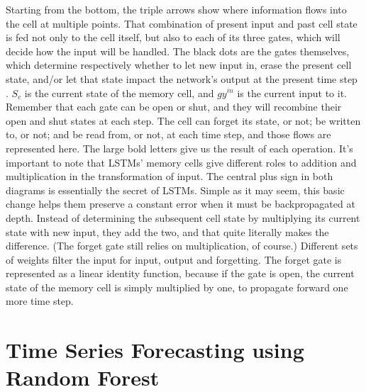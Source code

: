 \par Starting from the bottom, the triple arrows show where information flows into the cell at multiple points. That combination of present input and past cell state is fed not only to the cell itself, but also to each of its three gates, which will decide how the input will be handled. The black dots are the gates themselves, which determine respectively whether to let new input in, erase the present cell state, and/or let that state impact the network’s output at the present time step \cite{kyriakides2007short}. $S_{c}$ is the current state of the memory cell, and $gy^{in}$ is the current input to it. Remember that each gate can be open or shut, and they will recombine their open and shut states at each step. The cell can forget its state, or not; be written to, or not; and be read from, or not, at each time step, and those flows are represented here. The large bold letters give us the result of each operation. It’s important to note that LSTMs’ memory cells give different roles to addition and multiplication in the transformation of input. The central plus sign in both diagrams is essentially the secret of LSTMs. Simple as it may seem, this basic change helps them preserve a constant error when it must be backpropagated at depth. Instead of determining the subsequent cell state by multiplying its current state with new input, they add the two, and that quite literally makes the difference. (The forget gate still relies on multiplication, of course.) Different sets of weights filter the input for input, output and forgetting. The forget gate is represented as a linear identity function, because if the gate is open, the current state of the memory cell is simply multiplied by one, to propagate forward one more time step.
\chapter{Time Series Forecasting using Random Forest}

